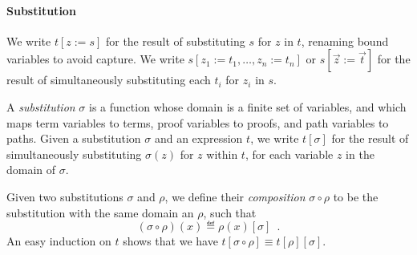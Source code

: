 \paragraph{Substitution}

We write $t[z:=s]$ for the result of substituting $s$ for $z$ in $t$,
renaming bound variables to avoid capture.  We write $s[z_1 := t_1, \ldots, z_n := t_n]$
or $s[\vec{z} := \vec{t}]$ for the result of simultaneously substituting
each $t_i$ for $z_i$ in $s$.

A \emph{substitution} $\sigma$ is a function whose domain is a finite set of variables, and
which maps term variables to terms, proof variables to proofs, and path variables to paths.
Given a substitution $\sigma$ and an expression $t$, we write $t[\sigma]$ for the result
of simultaneously substituting $\sigma(z)$ for $z$ within $t$, for each variable $z$ in the domain of $\sigma$.

Given two substitutions $\sigma$ and $\rho$, we define their \emph{composition} $\sigma \circ \rho$ to
be the substitution with the same domain an $\rho$, such that
\[ (\sigma \circ \rho)(x) \eqdef \rho(x)[\sigma] \enspace . \]
An easy induction on $t$ shows that we have $t [\sigma \circ \rho] \equiv t [ \rho ] [ \sigma ]$.
